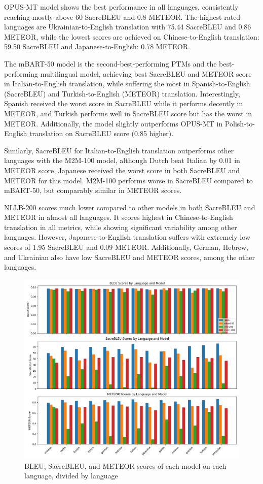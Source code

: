 \documentclass[a4paper]{article}
\begin{document}
OPUS-MT model shows the best performance in all languages, consistently reaching mostly above 60 SacreBLEU and 0.8 METEOR. The highest-rated languages are Ukrainian-to-English translation with 75.44 SacreBLEU and 0.86 METEOR, while the lowest scores are achieved on Chinese-to-English translation: 59.50 SacreBLEU and Japanese-to-English: 0.78 METEOR.

The mBART-50 model is the second-best-performing PTMs and the best-performing multilingual model, achieving best SacreBLEU and METEOR score in Italian-to-English translation, while suffering the most in Spanish-to-English (SacreBLEU) and Turkish-to-English (METEOR) translation. Interestingly, Spanish received the worst score in SacreBLEU while it performs decently in METEOR, and Turkish performs well in SacreBLEU score but has the worst in METEOR. Additionally, the model slightly outperforms OPUS-MT in Polish-to-English translation on SacreBLEU score (0.85 higher).

Similarly, SacreBLEU for Italian-to-English translation outperforms other languages with the M2M-100 model, although Dutch beat Italian by 0.01 in METEOR score. Japanese received the worst score in both SacreBLEU and METEOR for this model. M2M-100 performs worse in SacreBLEU compared to mBART-50, but comparably similar in METEOR scores.

NLLB-200 scores much lower compared to other models in both SacreBLEU and METEOR in almost all languages. It scores highest in Chinese-to-English translation in all metrics, while showing significant variability among other languages. However, Japanese-to-English translation suffers with extremely low scores of 1.95 SacreBLEU and 0.09 METEOR. Additionally, German, Hebrew, and Ukrainian also have low SacreBLEU and METEOR scores, among the other languages.

\begin{figure}[htbp]
    \centering
    \includegraphics[width=1\linewidth]{figures/metrics_bar.png}
    \caption{BLEU, SacreBLEU, and METEOR scores of each model on each language, divided by language}
    \label{fig:result_visual}
\end{figure}
\end{document}
